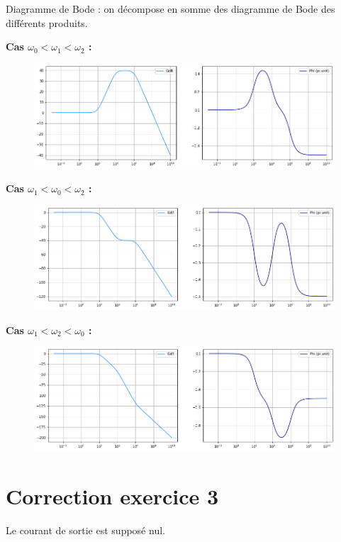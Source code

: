 \documentclass{report}
\begin{document}
Diagramme de Bode : on décompose en somme des diagramme de Bode des différents produits.

\textbf{Cas $\omega_0<\omega_1<\omega_2$ :}
\begin{figure}[!h]
	\centering
	\includegraphics[width=0.8\linewidth]{exo2_0.png}
\end{figure}

\textbf{Cas $\omega_1<\omega_0<\omega_2$ :}
\begin{figure}[!h]
	\centering
	\includegraphics[width=0.8\linewidth]{exo2_1.png}
\end{figure}

\textbf{Cas $\omega_1<\omega_2<\omega_0$ :}
\begin{figure}[!h]
	\centering
	\includegraphics[width=0.8\linewidth]{exo2_2.png}
\end{figure}

\section*{Correction exercice 3}

Le courant de sortie est supposé nul.
\end{document}

